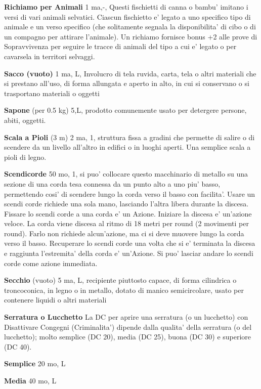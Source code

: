 \documentclass[a4paper,11pt,twoside,openany]{book}
\begin{document}
{		\textbf{Richiamo per Animali} 1 ma,-, Questi fischietti di canna o bambu' imitano i versi di vari animali selvatici. Ciascun fischietto e' legato a uno specifico tipo di animale e un verso specifico (che solitamente segnala la disponibilita' di cibo o di un compagno per attirare l'animale). Un richiamo fornisce bonus +2 alle prove di Sopravvivenza per seguire le tracce di animali del tipo a cui e' legato o per cavarsela in territori selvaggi.
		
		\textbf{Sacco (vuoto)} 1 ma, L, Involucro di tela ruvida, carta, tela o altri materiali che si prestano all'uso, di forma allungata e aperto in alto, in cui si conservano o si trasportano materiali o oggetti
		
		\textbf{Sapone} (per 0.5 kg) 5,L, prodotto comunemente usato per detergere persone, abiti, oggetti.
		
		\textbf{Scala a Pioli} (3 m) 2 ma, 1, struttura fissa a gradini che permette di salire o di scendere da un livello all'altro in edifici o in luoghi aperti. Una semplice scala a pioli di legno.
		
		\textbf{Scendicorde} 50 mo, 1, si puo' collocare questo macchinario di metallo su una sezione di una corda tesa connessa da un punto alto a uno piu' basso, permettendo cosi' di scendere lungo la corda verso il basso con facilita'. Usare un scendi corde richiede una sola mano, lasciando l'altra libera durante la discesa. Fissare lo scendi corde a una corda e' un Azione. Iniziare la discesa e' un'azione veloce. La corda viene discesa al ritmo di 18 metri per round (2 movimenti per round). Farlo non richiede alcun'azione, ma ci si deve muovere lungo la corda verso il basso. Recuperare lo scendi corde una volta che si e' terminata la discesa e raggiunta l'estremita' della corda e' un'Azione.
		Si puo' lasciar andare lo scendi corde come azione immediata.
		
		\textbf{Secchio} (vuoto) 5 ma, L, recipiente piuttosto capace, di forma cilindrica o troncoconica, in legno o in metallo, dotato di manico semicircolare, usato per contenere liquidi o altri materiali
		
		\textbf{Serratura o Lucchetto} La DC per aprire una serratura (o un lucchetto) con Disattivare Congegni (Criminalita') dipende dalla qualita' della serratura (o del lucchetto); molto semplice (DC 20), media (DC 25), buona (DC 30) e superiore (DC 40).
		
		\textbf{Semplice} 20 mo, L
		
		\textbf{Media} 40 mo, L
		
}
\end{document}
